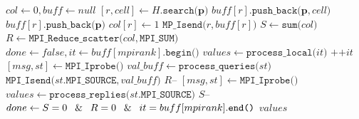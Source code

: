 \begin{algorithm}[htbp]
\caption{$values \gets \texttt{Interpolate (}H, \mathbf{X}\texttt{)}$}\label{euclid}
\begin{algorithmic}[1]
\State $col \gets 0, buff \gets null$ 
	\State $[r, cell] \gets H.\texttt{search(}\mathbf{p}\texttt{)}$ 
		\State $buff[r].\texttt{push\_back(}\mathbf{p}, cell\texttt{)}$
	\Else
		\State $buff[r].\texttt{push\_back(}\mathbf{p}\texttt{)}$
		\State $col[r] \gets 1$
	\EndIf
\EndFor
{} 
		\State $\texttt{MP\_Isend(}r, buff[r]\texttt{)}$
	\EndIf
\EndFor
\State  $S \gets \texttt{sum(}col\texttt{)}$ 
\State  $R \gets \texttt{MPI\_Reduce\_scatter(}col,\texttt{MPI\_SUM)}$
\State $done \gets false, it \gets buff[mpirank].\texttt{begin()}$
 
		\State $values \gets \texttt{process\_local(}it\texttt{)}$ 
		\State $\texttt{++}it$
	\EndIf
	 
		\State $[msg, st] \gets \texttt{MPI\_Iprobe()}$
			\State $val\_buff \gets \texttt{process\_queries(}st\texttt{)}$ 
			\State $\texttt{MPI\_Isend(}st.\texttt{MPI\_SOURCE},val\_buff\texttt{)}$ 
			\State $R\texttt{--}$
		\EndIf
	\EndIf
	 
		\State $[msg, st] \gets \texttt{MPI\_Iprobe()}$
			\State $values \gets \texttt{process\_replies(}st.\texttt{MPI\_SOURCE)}$ 
			\State $S\texttt{--}$
		\EndIf
	\EndIf
	\State $done \gets S = 0 \: \And \: R = 0 \: \And \: it = buff[mpirank].\texttt{end()}$
\EndWhile
\State \Return $values$
\end{algorithmic}
\label{alg:interpolation}
\end{algorithm}

